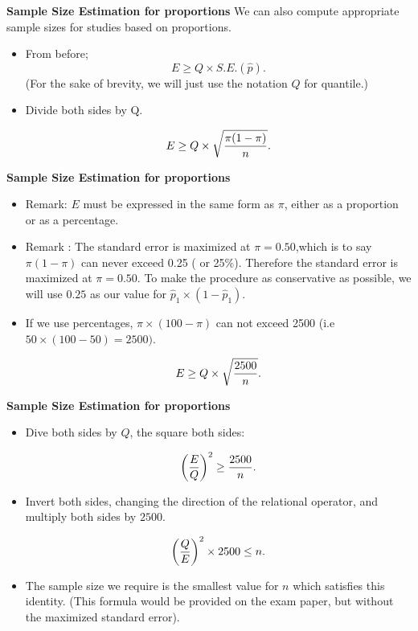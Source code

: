 \documentclass[]{report}
\begin{document}

\noindent \textbf{Sample Size Estimation for proportions}
We can also compute appropriate sample sizes for studies based on proportions.
\begin{itemize}
\item From before; \[ E \geq Q \times S.E.(\hat{p}). \]
(For the sake of brevity, we will just use the notation $Q$ for quantile.)

\item Divide both sides by Q.

\[ E \geq Q \times \sqrt{ {\pi(1-\pi)  \over n} }. \]

\end{itemize}



\noindent \textbf{Sample Size Estimation for proportions}
\begin{itemize}
\item Remark: $E$ must be expressed in the same form as $\pi$, either as a proportion or as a percentage.
\item Remark : The standard error is maximized at $\pi = 0.50$,which is to say $\pi(1-\pi)$ can never exceed 0.25 ( or 25\%). Therefore the standard error is maximized at $\pi = 0.50$. To make the procedure as conservative as possible, we will use $0.25$ as our value for $\hat{p}_1 \times (1 - \hat{p}_1)$.
\item If we use percentages, $\pi \times (100-\pi)$ can not exceed 2500 (i.e $ 50 \times (100-50)=2500)$.

\[ E \geq Q \times \sqrt{{2500 \over n}}. \]


\end{itemize}



\noindent \textbf{Sample Size Estimation for proportions}

\begin{itemize}

\item Dive both sides by $Q$, the square both sides:

\[ \left({E\over Q}\right)^2 \geq {2500 \over n}. \]

\item Invert both sides, changing the direction of the relational operator, and multiply both sides by $2500$.

\[ \left({Q\over E}\right)^2 \times 2500 \leq n. \]

\item The sample size we require is the smallest value for $n$ which satisfies this identity. (This formula would be provided on the exam paper, but without the maximized standard error).
\end{itemize}
\end{document}
